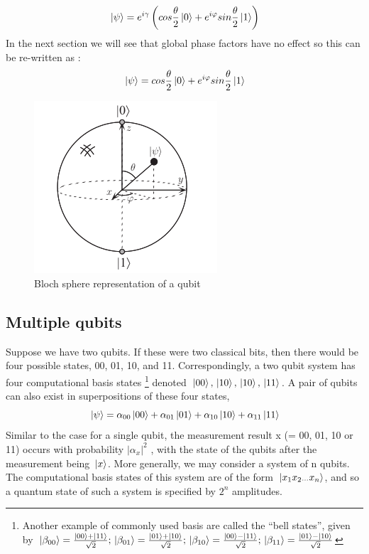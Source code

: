 \documentclass[conference]{IEEEtran}
\begin{document}
\begin{equation*}
    \ket*{\psi} = e^{i\gamma}\left(cos\frac{\theta}{2}\ket*{0} + e^{i\varphi}sin\frac{\theta}{2}\ket*{1}\right)
\end{equation*}
In the next section we will see that global phase factors have no effect so this can be re-written as : 
\begin{equation*}
    \ket*{\psi} = cos\frac{\theta}{2}\ket*{0} + e^{i\varphi}sin\frac{\theta}{2}\ket*{1}
\end{equation*}

\begin{figure}[htbp]
\centerline{\includegraphics[scale = 0.5]{Images/bloch.png}}
\caption{Bloch sphere representation of a qubit}
\label{bloch}
\end{figure}

\subsection{Multiple qubits}
Suppose we have two qubits. If these were two classical bits, then there would be four
possible states, 00, 01, 10, and 11. Correspondingly, a two qubit system has four computational basis states 
\footnote{Another example of commonly used basis are called the ``bell states'', given by $\ket*{\beta_{00}} = \frac{\ket*{00} + \ket*{11}}{\sqrt{2}}; \ket*{\beta_{01}} = \frac{\ket*{01} + \ket*{10}}{\sqrt{2}}; \ket*{\beta_{10}} = \frac{\ket*{00} - \ket*{11}}{\sqrt{2}}; \ket*{\beta_{11}} = \frac{\ket*{01} - \ket*{10}}{\sqrt{2}}$}
denoted $\ket*{00}, \ket*{10}, \ket*{10}, \ket*{11}$. A pair of qubits can also exist in
superpositions of these four states,
\begin{equation*}
    \ket*{\psi} = \alpha_{00}\ket*{00} + \alpha_{01}\ket*{01} + \alpha_{10}\ket*{10} + \alpha_{11}\ket*{11}
\end{equation*}
Similar to the case for a single qubit, the measurement result x (= 00, 01, 10 or 11) occurs
with probability $|\alpha_x|^2$ , with the state of the qubits after the measurement being $\ket*{x}$.
More generally, we may consider a system of n qubits. The computational basis states
of this system are of the form $\ket*{x_{1}x_{2}{}_{\cdots}x_{n}}$, and so a quantum state of such a system
is speciﬁed by $2^n$ amplitudes.
\end{document}
